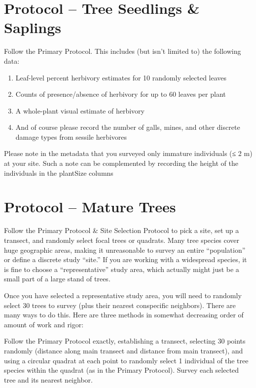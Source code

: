 \documentclass[
  letterpaper,
  oneside,
  open=any]{scrbook}
\providecommand{\tightlist}{%
  \setlength{\itemsep}{0pt}\setlength{\parskip}{0pt}}\usepackage{longtable,booktabs,array}
\begin{document}
\section{Protocol -- Tree Seedlings \&
Saplings}\label{protocol-tree-seedlings-saplings}

Follow the Primary Protocol. This includes (but isn't limited to) the
following data:

\begin{enumerate}
\def\labelenumi{\arabic{enumi}.}
\tightlist
\item
  Leaf-level percent herbivory estimates for 10 randomly selected leaves
\item
  Counts of presence/absence of herbivory for up to 60 leaves per plant
\item
  A whole-plant visual estimate of herbivory
\item
  And of course please record the number of galls, mines, and other
  discrete damage types from sessile herbivores
\end{enumerate}

Please note in the metadata that you surveyed only immature individuals
(≤ 2 m) at your site. Such a note can be complemented by recording the
height of the individuals in the plantSize columns

\section{Protocol -- Mature Trees}\label{protocol-mature-trees}

Follow the Primary Protocol \& Site Selection Protocol to pick a site,
set up a transect, and randomly select focal trees or quadrats. Many
tree species cover huge geographic areas, making it unreasonable to
survey an entire ``population'' or define a discrete study ``site.'' If
you are working with a widespread species, it is fine to choose a
``representative'' study area, which actually might just be a small part
of a large stand of trees.

Once you have selected a representative study area, you will need to
randomly select 30 trees to survey (plus their nearest conspecific
neighbors). There are many ways to do this. Here are three methods in
somewhat decreasing order of amount of work and rigor:

Follow the Primary Protocol exactly, establishing a transect, selecting
30 points randomly (distance along main transect and distance from main
transect), and using a circular quadrat at each point to randomly select
1 individual of the tree species within the quadrat (as in the Primary
Protocol). Survey each selected tree and its nearest neighbor.
\end{document}

